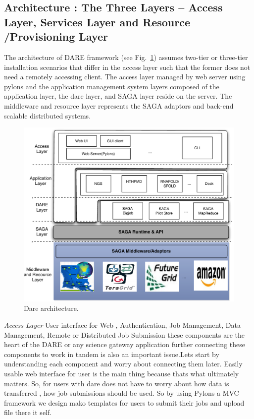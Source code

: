 \documentclass{sig-alternate}
\begin{document}
\subsection{Architecture : The Three Layers -- Access Layer, Services Layer and Resource /Provisioning Layer}
The architecture of DARE framework (see Fig.~\ref{fig:dare-arch}) assumes two-tier or three-tier installation scenarios that differ in the access layer such that the former does not need a remotely accessing client.  The access layer managed by web server using pylons and the application management system layers composed of the application layer, the dare layer, and SAGA layer reside on the server.  The middleware and resource layer represents the SAGA adaptors and back-end scalable distributed systems.  


\begin{figure}
 \centering
\includegraphics[scale=0.40]{figures/DAREOutline.pdf}

\caption{\small Dare architecture.}
  \label{fig:dare-arch} 
\end{figure}

 

%


\textit{Access Layer} User interface for Web ,  Authentication, Job Management, Data Management, Remote or Distributed Job Submission these components are the heart of the DARE or any science gateway application further connecting these components to work in tandem is also an important issue.Lets start by understanding each component and worry about connecting them later.  Easily usable web interface for user is the main thing because thats what ultimately matters. So, for users with dare does not have to worry about how data is transferred , how job submissions should be used. So by using Pylons a MVC framework we design mako templates for users to submit their jobs and upload file there it self.
\end{document}
